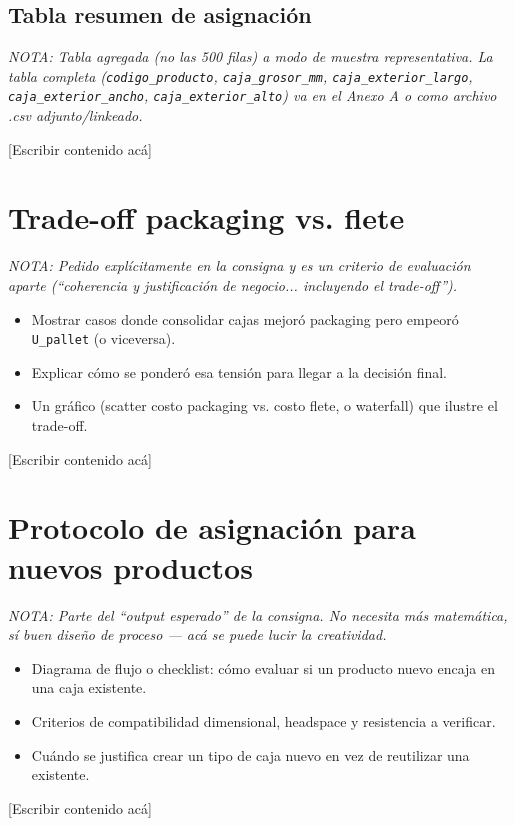 \documentclass[11pt]{article}
\newcommand{\nota}[1]{{\itshape\color{notegray}\small NOTA: #1}\par\vspace{2pt}}
\newenvironment{notalist}{\begin{itemize}[itemsep=1pt,topsep=2pt,leftmargin=1.4em]\itshape\color{notegray}\small}{\end{itemize}\vspace{2pt}}
\newcommand{\placeholder}{\color{placeholdergray}[Escribir contenido acá]\color{black}\par\vspace{6pt}}
\begin{document}
\subsection{Tabla resumen de asignación}
\nota{Tabla agregada (no las 500 filas) a modo de muestra representativa. La tabla completa (\texttt{codigo\_producto}, \texttt{caja\_grosor\_mm}, \texttt{caja\_exterior\_largo}, \texttt{caja\_exterior\_ancho}, \texttt{caja\_exterior\_alto}) va en el Anexo A o como archivo .csv adjunto/linkeado.}
\placeholder

\section{Trade-off packaging vs. flete}
\nota{Pedido explícitamente en la consigna y es un criterio de evaluación aparte (``coherencia y justificación de negocio... incluyendo el trade-off'').}
\begin{notalist}
\item Mostrar casos donde consolidar cajas mejoró packaging pero empeoró \texttt{U\_pallet} (o viceversa).
\item Explicar cómo se ponderó esa tensión para llegar a la decisión final.
\item Un gráfico (scatter costo packaging vs. costo flete, o waterfall) que ilustre el trade-off.
\end{notalist}
\placeholder

\section{Protocolo de asignación para nuevos productos}
\nota{Parte del ``output esperado'' de la consigna. No necesita más matemática, sí buen diseño de proceso --- acá se puede lucir la creatividad.}
\begin{notalist}
\item Diagrama de flujo o checklist: cómo evaluar si un producto nuevo encaja en una caja existente.
\item Criterios de compatibilidad dimensional, headspace y resistencia a verificar.
\item Cuándo se justifica crear un tipo de caja nuevo en vez de reutilizar una existente.
\end{notalist}
\placeholder
\end{document}
